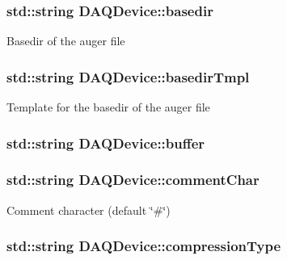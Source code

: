 \hypertarget{classDAQDevice_add8342b70f7350c0d8b7bf4ba3e9c5b4}{
\subsubsection[{basedir}]{\setlength{\rightskip}{0pt plus 5cm}std\-::string D\-A\-Q\-Device\-::basedir\hspace{0.3cm}{\ttfamily [private]}}}\label{classDAQDevice_add8342b70f7350c0d8b7bf4ba3e9c5b4}
Basedir of the auger file \hypertarget{classDAQDevice_a6dc47f2c1a792f5a1ed09b03ac98e8cc}{
\subsubsection[{basedir\-Tmpl}]{\setlength{\rightskip}{0pt plus 5cm}std\-::string D\-A\-Q\-Device\-::basedir\-Tmpl\hspace{0.3cm}{\ttfamily [private]}}}\label{classDAQDevice_a6dc47f2c1a792f5a1ed09b03ac98e8cc}
Template for the basedir of the auger file \hypertarget{classDAQDevice_ab661aa5c5b4bafe78354f5169b1c7d2f}{
\subsubsection[{buffer}]{\setlength{\rightskip}{0pt plus 5cm}std\-::string D\-A\-Q\-Device\-::buffer\hspace{0.3cm}{\ttfamily [protected]}}}\label{classDAQDevice_ab661aa5c5b4bafe78354f5169b1c7d2f}
\hypertarget{classDAQDevice_af34a3a4a6cc3b4a8c01ce42d495be6c2}{
\subsubsection[{comment\-Char}]{\setlength{\rightskip}{0pt plus 5cm}std\-::string D\-A\-Q\-Device\-::comment\-Char\hspace{0.3cm}{\ttfamily [protected]}}}\label{classDAQDevice_af34a3a4a6cc3b4a8c01ce42d495be6c2}
Comment character (default \char`\"{}\#\char`\"{}) \hypertarget{classDAQDevice_ac06e9cd93e95a3c4e33970edb79f9148}{
\subsubsection[{compression\-Type}]{\setlength{\rightskip}{0pt plus 5cm}std\-::string D\-A\-Q\-Device\-::compression\-Type\hspace{0.3cm}{\ttfamily [protected]}}}\label{classDAQDevice_ac06e9cd93e95a3c4e33970edb79f9148}
